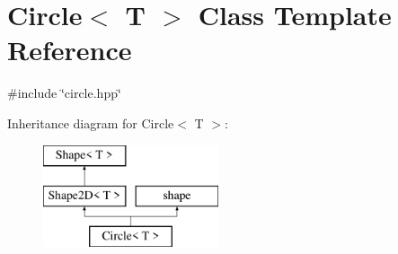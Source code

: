 \hypertarget{classCircle}{}\section{Circle$<$ T $>$ Class Template Reference}
\label{classCircle}


{\ttfamily \#include \char`\"{}circle.\+hpp\char`\"{}}

Inheritance diagram for Circle$<$ T $>$\+:\begin{figure}[H]
\begin{center}
\leavevmode
\includegraphics[height=3.000000cm]{classCircle}
\end{center}
\end{figure}
